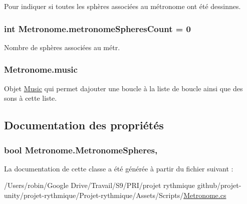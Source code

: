 Pour indiquer si toutes les sphères associées au métronome ont été dessinnes. 

\hypertarget{class_metronome_a7e536279ddfa76b2aa0b77112ec0dd38}{}
\subsubsection[{metronome\+Spheres\+Count}]{\setlength{\rightskip}{0pt plus 5cm}int Metronome.\+metronome\+Spheres\+Count = 0\hspace{0.3cm}{\ttfamily [private]}}\label{class_metronome_a7e536279ddfa76b2aa0b77112ec0dd38}


Nombre de sphères associées au métr. 

\hypertarget{class_metronome_a9434e9e563d5b903c4a800d7529a0c9a}{}
\subsubsection[{music}]{ Metronome.\+music}\label{class_metronome_a9434e9e563d5b903c4a800d7529a0c9a}


Objet \hyperlink{class_music}{Music} qui permet d\textquotesingle{}ajouter une boucle à la liste de boucle ainsi que des sons à cette liste. 



\subsection{Documentation des propriétés}
\hypertarget{class_metronome_a2f04bf014bd373f690a955cce3298116}{}
\subsubsection[{Metronome\+Spheres}]{\setlength{\rightskip}{0pt plus 5cm}bool Metronome.\+Metronome\+Spheres\hspace{0.3cm}{\ttfamily [get]}, {\ttfamily [set]}}\label{class_metronome_a2f04bf014bd373f690a955cce3298116}


La documentation de cette classe a été générée à partir du fichier suivant \+:\begin{DoxyCompactItemize}
\item 
/\+Users/robin/\+Google Drive/\+Travail/\+S9/\+P\+R\+I/projet rythmique github/projet-\/unity/projet-\/rythmique/\+Projet-\/rythmique/\+Assets/\+Scripts/\hyperlink{_metronome_8cs}{Metronome.\+cs}\end{DoxyCompactItemize}

